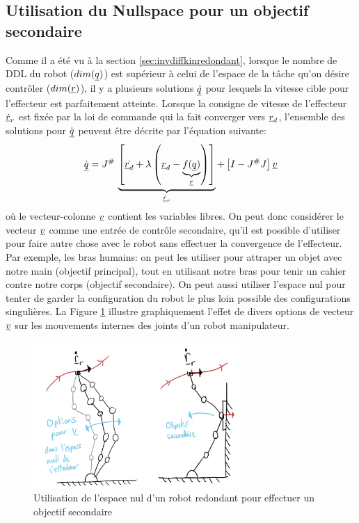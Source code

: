 \subsection{Utilisation du Nullspace pour un objectif secondaire}

Comme il a été vu à la section \ref{sec:invdiffkinredondant}, lorsque le nombre de DDL du robot ($dim(\underline{q})$) est supérieur à celui de l'espace de la tâche qu'on désire contrôler ($dim(\underline{r})$), il y a plusieurs solutions $\underline{\dot{q}}$ pour lesquels la vitesse cible pour l'effecteur est parfaitement atteinte. Lorsque la consigne de vitesse de l'effecteur $\underline{\dot{r}}_r$ est fixée par la loi de commande qui la fait converger vers $\underline{r}_d$,  l'ensemble des solutions pour $\dot{\underline{q}}$ peuvent être décrite par l'équation suivante:
\begin{align}
\dot{\underline{q}} = J^{\#} \, 
\underbrace{
\left[ \dot{\underline{r}_d} + \lambda \left( \underline{r}_d  - \underbrace{f(\underline{q})}_{\underline{r}}  \right)\right] 
}_{\underline{\dot{r}}_r}
+ \left[ I - J^{\#}J  \right] \underline{v}
\end{align}
où le vecteur-colonne $\underline{v}$ contient les variables libres. On peut donc considérer le vecteur $\underline{v}$ comme une entrée de contrôle secondaire, qu'il est possible d'utiliser pour faire autre chose avec le robot sans effectuer la convergence de l'effecteur. Par exemple, les bras humains: on peut les utiliser pour attraper un objet avec notre main (objectif principal), tout en utilisant notre bras pour tenir un cahier contre notre corps (objectif secondaire). On peut aussi utiliser l'espace nul pour tenter de garder la configuration du robot le plus loin possible des configurations singulières. La Figure \ref{fig:nullspacecontrol} illustre graphiquement l'effet de divers options de vecteur $\underline{v}$ sur les mouvements internes des joints d'un robot manipulateur. 

\begin{figure}[H]
	\centering
		\includegraphics[width=0.70\textwidth]{fig/nullspacecontrol.jpg}
	\caption{Utilisation de l'espace nul d'un robot redondant pour effectuer un objectif secondaire}
	\label{fig:nullspacecontrol}
\end{figure}


